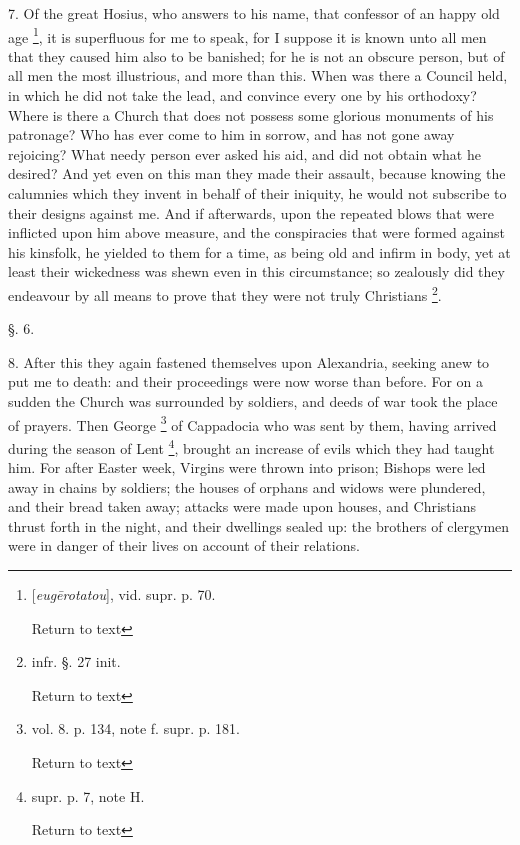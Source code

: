 7. Of the great Hosius, who answers to his name,
that confessor of an happy old age \footnote{[\emph{eug\={e}rotatou}], vid. supr. p. 70.

Return to text}, it is superfluous for me to speak, for I suppose it is known
unto all men that they caused him also to be banished; for he is not
an obscure person, but of all men the most illustrious, and more than
this. When was there a Council held, in which he did not take the
lead, and convince every one by his orthodoxy? Where is there a Church
that does not possess some glorious monuments of his patronage? Who
has ever come to him in sorrow, and has not gone away rejoicing? What
needy person ever asked his aid, and did not obtain what he desired?
And yet even on this man they made their assault, because knowing the
calumnies which they invent in behalf of their iniquity, he would not
subscribe to their designs against me. And if afterwards, upon
the repeated blows that were inflicted upon him above measure, and the
conspiracies that were formed against his kinsfolk, he yielded to them
for a time, as being old and infirm in body, yet at least their
wickedness was shewn even in this circumstance; so zealously did they
endeavour by all means to prove that they were not truly Christians \footnote{infr. §. 27 init.

Return to text}.

§. 6.

8. After this they again fastened themselves upon
Alexandria, seeking anew to put me to death: and their proceedings
were now worse than before. For on a sudden the Church was surrounded
by soldiers, and deeds of war took the place of prayers. Then George \footnote{vol. 8. p. 134, note f. supr. p. 181.

Return to text} of Cappadocia who was sent by them, having arrived during the
season of Lent \footnote{supr. p. 7, note H.

Return to text},
brought an increase of evils which they had taught him. For after
Easter week, Virgins were thrown into prison; Bishops were led away in
chains by soldiers; the houses of orphans and widows were plundered,
and their bread taken away; attacks were made upon houses, and
Christians thrust forth in the night, and their dwellings sealed up:
the brothers of clergymen were in danger of their lives on account of
their relations.

